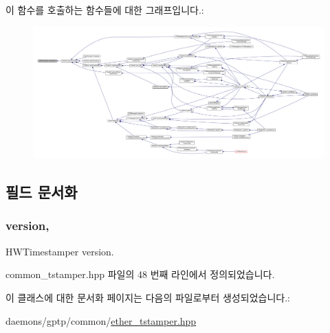 이 함수를 호출하는 함수들에 대한 그래프입니다.\+:
\nopagebreak
\begin{figure}[H]
\begin{center}
\leavevmode
\includegraphics[width=350pt]{class_ether_timestamper_a82619058d136ce4314189f1c9db91914_icgraph}
\end{center}
\end{figure}




\subsection{필드 문서화}
\subsubsection[{\texorpdfstring{version}{version}}]{ version\hspace{0.3cm}{\ttfamily [protected]}, {\ttfamily [inherited]}}\hypertarget{class_common_timestamper_ab22abc2906422da61885ac6c8e6a1a59}{}\label{class_common_timestamper_ab22abc2906422da61885ac6c8e6a1a59}


H\+W\+Timestamper version. 



common\+\_\+tstamper.\+hpp 파일의 48 번째 라인에서 정의되었습니다.



이 클래스에 대한 문서화 페이지는 다음의 파일로부터 생성되었습니다.\+:\begin{DoxyCompactItemize}
\item 
daemons/gptp/common/\hyperlink{ether__tstamper_8hpp}{ether\+\_\+tstamper.\+hpp}\end{DoxyCompactItemize}
